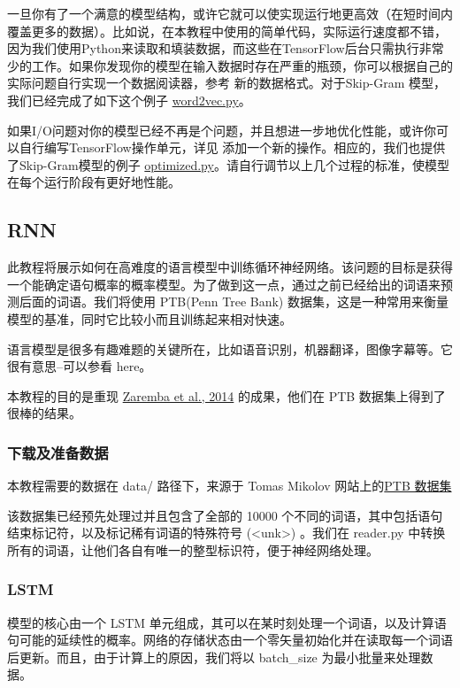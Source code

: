 一旦你有了一个满意的模型结构，或许它就可以使实现运行地更高效（在短时间内覆盖更多的数据）。比如说，在本教程中使用的简单代码，实际运行速度都不错，因为我们使用Python来读取和填装数据，而这些在TensorFlow后台只需执行非常少的工作。如果你发现你的模型在输入数据时存在严重的瓶颈，你可以根据自己的实际问题自行实现一个数据阅读器，参考 新的数据格式。对于Skip-Gram 模型，我们已经完成了如下这个例子 \href{https://github.com/bleedingfight/models/tree/master/tutorials/embedding}{word2vec.py}。

如果I/O问题对你的模型已经不再是个问题，并且想进一步地优化性能，或许你可以自行编写TensorFlow操作单元，详见 添加一个新的操作。相应的，我们也提供了Skip-Gram模型的例子 \href{https://github.com/bleedingfight/models/tree/master/tutorials/embedding}{optimized.py}。请自行调节以上几个过程的标准，使模型在每个运行阶段有更好地性能。
\subsection{RNN}
此教程将展示如何在高难度的语言模型中训练循环神经网络。该问题的目标是获得一个能确定语句概率的概率模型。为了做到这一点，通过之前已经给出的词语来预测后面的词语。我们将使用 PTB(Penn Tree Bank) 数据集，这是一种常用来衡量模型的基准，同时它比较小而且训练起来相对快速。

语言模型是很多有趣难题的关键所在，比如语音识别，机器翻译，图像字幕等。它很有意思--可以参看 here。

本教程的目的是重现 \href{http://arxiv.org/abs/1409.2329}{Zaremba et al., 2014} 的成果，他们在 PTB 数据集上得到了很棒的结果。
\subsubsection{下载及准备数据}
本教程需要的数据在 data/ 路径下，来源于 Tomas Mikolov 网站上的\href{http://www.fit.vutbr.cz/~imikolov/rnnlm/simple-examples.tg}{PTB 数据集}

该数据集已经预先处理过并且包含了全部的 10000 个不同的词语，其中包括语句结束标记符，以及标记稀有词语的特殊符号 (<unk>) 。我们在 reader.py 中转换所有的词语，让他们各自有唯一的整型标识符，便于神经网络处理。
\subsubsection{LSTM}
模型的核心由一个 LSTM 单元组成，其可以在某时刻处理一个词语，以及计算语句可能的延续性的概率。网络的存储状态由一个零矢量初始化并在读取每一个词语后更新。而且，由于计算上的原因，我们将以 batch\_size 为最小批量来处理数据。

